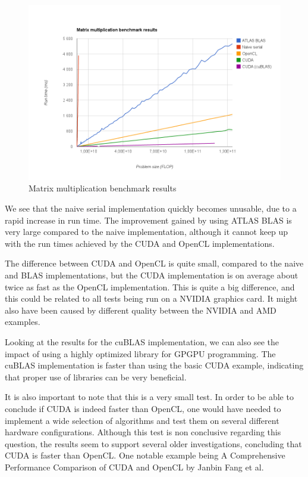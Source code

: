 \begin{figure}[ht!]
    \centering
    \includegraphics[width=120mm]{../gfx/matrix-multiplication-benchmark-results.png}
    \caption{Matrix multiplication benchmark results}
    \label{fig:matrix-multiplication-benchmark-results}
\end{figure}

We see that the naive serial implementation quickly becomes unusable, due to a rapid increase in run time. The improvement gained by using ATLAS BLAS is very large compared to the naive implementation, although it cannot keep up with the run times achieved by the CUDA and OpenCL implementations.

The difference between CUDA and OpenCL is quite small, compared to the naive and BLAS implementations, but the CUDA implementation is on average about twice as fast as the OpenCL implementation. This is quite a big difference, and this could be related to all tests being run on a NVIDIA graphics card. It might also have been caused by different quality between the NVIDIA and AMD examples.

Looking at the results for the cuBLAS implementation, we can also see the impact of using a highly optimized library for GPGPU programming. The cuBLAS implementation is faster than using the basic CUDA example, indicating that proper use of libraries can be very beneficial.

It is also important to note that this is a very small test. In order to be able to conclude if CUDA is indeed faster than OpenCL, one would have needed to implement a wide selection of algorithms and test them on several different hardware configurations. Although this test is non conclusive regarding this question, the results seem to support several older investigations, concluding that CUDA is faster than OpenCL\@. One notable example being A Comprehensive Performance Comparison of
CUDA and OpenCL\cite{Fang11} by Janbin Fang et al.


